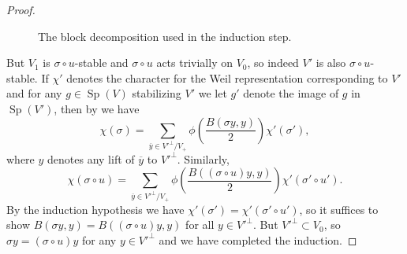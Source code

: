 \documentclass[reqno]{amsart}
\numberwithin{equation}{subsection}
\DeclareRobustCommand{\sean}[1]{{\color{red}\sffamily $\heartsuit\heartsuit\heartsuit$ SEAN: [#1]}}
\newcommand{\ol}[1]{\overline{#1}}
\DeclareMathOperator{\Sp}{Sp}
\theoremstyle{remark}
\numberwithin{equation}{subsection}
\numberwithin{figure}{subsection}
\begin{document}
\begin{proof}
\begin{figure}[H]
\begin{minipage}{0.96\textwidth}
\end{minipage}
\caption{The block decomposition used in the induction step.}
\label{fig:weil-heisenberg-block-decomposition}
\end{figure}

But $V_1$ is $\sigma \circ u$-stable and $\sigma \circ u$ acts trivially on $V_0$, so indeed $V'$ is also $\sigma \circ u$-stable. If $\chi'$ denotes the character for the Weil representation corresponding to $V'$ and for any $g \in \Sp(V)$ stabilizing $V'$ we let $g'$ denote the image of $g$ in $\Sp(V')$, then by \cite[Theorem 4.9.1(c)]{Ger77} we have
\[
\chi(\sigma) = \sum_{\ol y \in V'^\perp/V_+} \phi\left(\frac{B(\sigma y, y)}{2}\right) \chi'(\sigma'),
\]
where $y$ denotes any lift of $\ol y$ to $V'^\perp$. Similarly,
\[
\chi(\sigma \circ u) = \sum_{\ol y \in V'^\perp/V_+} \phi\left(\frac{B((\sigma \circ u)y, y)}{2}\right)\chi'(\sigma' \circ u').
\]
By the induction hypothesis we have $\chi'(\sigma') = \chi'(\sigma' \circ u')$, so it suffices to show $B(\sigma y, y) = B((\sigma \circ u)y, y)$ for all $y \in V'^\perp$. But $V'^\perp \subset V_0$, so $\sigma y = (\sigma \circ u)y$ for any $y \in V'^\perp$ and we have completed the induction.


\end{proof}
\end{document}
